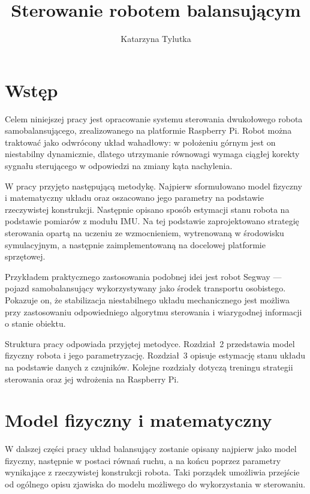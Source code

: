 \documentclass[12pt,twoside]{article}
\author{Katarzyna Tylutka}
\title{Sterowanie robotem balansującym}
\begin{document}
\maketitle

\blankpage

\tableofcontents

\clearpage
\blankpage

\section{Wstęp}

Celem niniejszej pracy jest opracowanie systemu sterowania dwukołowego robota samobalansującego, zrealizowanego na platformie Raspberry Pi. Robot można traktować jako odwrócony układ wahadłowy: w położeniu górnym jest on niestabilny dynamicznie, dlatego utrzymanie równowagi wymaga ciągłej korekty sygnału sterującego w odpowiedzi na zmiany kąta nachylenia.

W pracy przyjęto następującą metodykę. Najpierw sformułowano model fizyczny i matematyczny układu oraz oszacowano jego parametry na podstawie rzeczywistej konstrukcji. Następnie opisano sposób estymacji stanu robota na podstawie pomiarów z modułu IMU. Na tej podstawie zaprojektowano strategię sterowania opartą na uczeniu ze wzmocnieniem, wytrenowaną w środowisku symulacyjnym, a następnie zaimplementowaną na docelowej platformie sprzętowej.

Przykładem praktycznego zastosowania podobnej idei jest robot Segway --- pojazd samobalansujący wykorzystywany jako środek transportu osobistego. Pokazuje on, że stabilizacja niestabilnego układu mechanicznego jest możliwa przy zastosowaniu odpowiedniego algorytmu sterowania i wiarygodnej informacji o stanie obiektu.

Struktura pracy odpowiada przyjętej metodyce. Rozdział~2 przedstawia model fizyczny robota i jego parametryzację. Rozdział~3 opisuje estymację stanu układu na podstawie danych z czujników. Kolejne rozdziały dotyczą treningu strategii sterowania oraz jej wdrożenia na Raspberry Pi.

\section{Model fizyczny i matematyczny}

W dalszej części pracy układ balansujący zostanie opisany najpierw jako model fizyczny, następnie w postaci równań ruchu, a na końcu poprzez parametry wynikające z rzeczywistej konstrukcji robota. Taki porządek umożliwia przejście od ogólnego opisu zjawiska do modelu możliwego do wykorzystania w sterowaniu.
\end{document}
